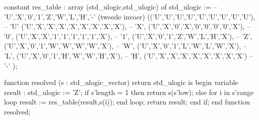constant res_table : array (std_ulogic,std_ulogic) of std_ulogic :=
 -- 'U','X','0','1','Z','W','L','H','-' (tweede invoer)
  (('U','U','U','U','U','U','U','U','U'), -- 'U'
   ('U','X','X','X','X','X','X','X','X'), -- 'X',
   ('U','X','0','X','0','0','0','0','X'), -- '0',
   ('U','X','X','1','1','1','1','1','X'), -- '1',
   ('U','X','0','1','Z','W','L','H','X'), -- 'Z',
   ('U','X','0','1','W','W','W','W','X'), -- 'W',
   ('U','X','0','1','L','W','L','W','X'), -- 'L',
   ('U','X','0','1','H','W','W','H','X'), -- 'H',
   ('U','X','X','X','X','X','X','X','X')  -- '-'
  );

function resolved (s : std_ulogic_vector) return std_ulogic is
begin
    variable result : std_ulogic := 'Z';
    if s'length = 1 then
        return s(s'low);
    else
        for i in s'range loop
            result := res_table(result,s(i));
        end loop;
    return result;
    end if;
end function resolved;